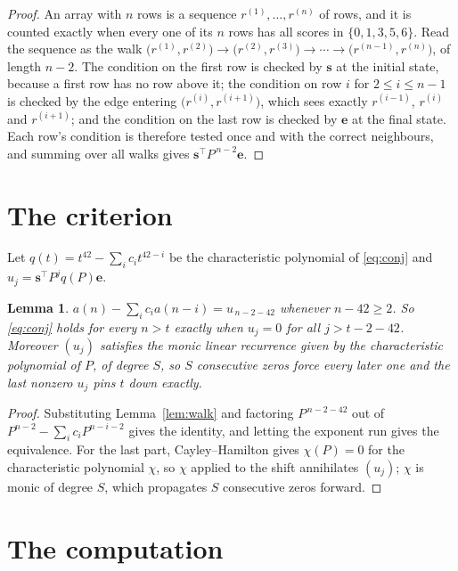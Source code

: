 \documentclass[11pt,a4paper]{article}
\theoremstyle{plain}
\newtheorem{lemma}[theorem]{Lemma}
\theoremstyle{definition}
\begin{document}
\begin{proof}
An array with $n$ rows is a sequence $r^{(1)},\dots,r^{(n)}$ of rows, and it is counted
exactly when every one of its $n$ rows has all scores in $\{0,1,3,5,6\}$. Read the sequence as the
walk $\bigl(r^{(1)},r^{(2)}\bigr)\to\bigl(r^{(2)},r^{(3)}\bigr)\to\cdots\to
\bigl(r^{(n-1)},r^{(n)}\bigr)$, of length $n-2$. The condition on the first row is
checked by $\mathbf{s}$ at the initial state, because a first row has no row above it; the
condition on row $i$ for $2\le i\le n-1$ is checked by the edge entering
$\bigl(r^{(i)},r^{(i+1)}\bigr)$, which sees exactly $r^{(i-1)}$, $r^{(i)}$ and
$r^{(i+1)}$; and the condition on the last row is checked by $\mathbf{e}$ at the final
state. Each row's condition is therefore tested once and with the correct neighbours, and
summing over all walks gives $\mathbf{s}^{\!\top}P^{\,n-2}\mathbf{e}$.
\end{proof}

\section{The criterion}

Let $q(t)=t^{42}-\sum_i c_i t^{42-i}$ be the characteristic polynomial of
\eqref{eq:conj} and $u_j=\mathbf{s}^{\!\top}P^{j}q(P)\mathbf{e}$.

\begin{lemma}\label{lem:crit}
$a(n)-\sum_i c_i a(n-i)=u_{\,n-2-42}$ whenever $n-42\ge2$. So \eqref{eq:conj}
holds for every $n>t$ exactly when $u_j=0$ for all $j>t-2-42$. Moreover $(u_j)$
satisfies the monic linear recurrence given by the characteristic polynomial of $P$, of
degree $S$, so $S$ consecutive zeros force every later one and the last nonzero $u_j$ pins
$t$ down exactly.
\end{lemma}

\begin{proof}
Substituting Lemma~\ref{lem:walk} and factoring $P^{\,n-2-42}$ out of
$P^{n-2}-\sum_i c_i P^{n-i-2}$ gives the identity, and letting the exponent run gives the
equivalence. For the last part, Cayley--Hamilton gives $\chi(P)=0$ for the characteristic
polynomial $\chi$, so $\chi$ applied to the shift annihilates $(u_j)$; $\chi$ is monic of
degree $S$, which propagates $S$ consecutive zeros forward.
\end{proof}

\section{The computation}
\end{document}
